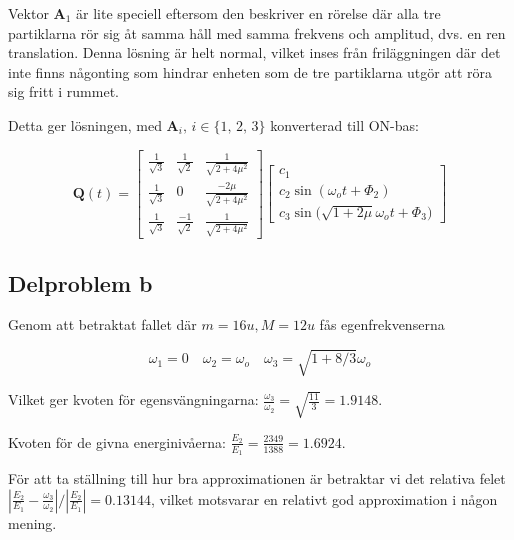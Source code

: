 \documentclass[12pt,a4paper]{article}
\begin{document}
	Vektor $\mathbf{A}_1$ är lite speciell eftersom den beskriver en rörelse där alla tre partiklarna rör
	sig åt samma håll med samma frekvens och amplitud, dvs. en ren translation. Denna lösning är
	helt normal, vilket inses från friläggningen där det inte finns någonting som hindrar enheten
	som de tre partiklarna utgör att röra sig fritt i rummet.
	
	Detta ger lösningen, med $\mathbf{A}_i, \, i \in \{1,\,2,\,3\}$ konverterad till ON-bas:
	
	\begin{equation*}
		\mathbf{Q}(t) = 
		\begin{bmatrix}
			\frac{1}{\sqrt{3}} & \frac{1}{\sqrt{2}}  & \frac{1}{\sqrt{2 + 4 \mu^2}} \\
			\frac{1}{\sqrt{3}} & 0                   & \frac{-2 \mu}{\sqrt{2 + 4 \mu^2}} \\
			\frac{1}{\sqrt{3}} & \frac{-1}{\sqrt{2}} & \frac{1}{\sqrt{2 + 4 \mu^2}}
		\end{bmatrix}
		\begin{bmatrix}
			c_1 \\
			c_2 \sin(\omega_o t + \Phi_2) \\
			c_3 \sin\big(\sqrt{1+2 \mu}\omega_o t + \Phi_3 \big)
		\end{bmatrix}
	\end{equation*}

	\subsection{Delproblem b}
		
		Genom att betraktat fallet där $m=16u, M=12u$ fås egenfrekvenserna 
		
		\begin{equation*}
			\omega_1 = 0 \hspace{12pt} \omega_2 = \omega_o \hspace{12pt} \omega_3 = \sqrt{1+8/3} \omega_o
		\end{equation*}
		
		Vilket ger kvoten för egensvängningarna: $\frac{\omega_3}{\omega_2} =\sqrt{\frac{11}{3}} = 1.9148$.
		
		Kvoten för de givna energinivåerna: $\frac{E_2}{E_1} = \frac{2349}{1388} = 1.6924$.
		
		För att ta ställning till hur bra approximationen är betraktar vi det relativa felet
		$|\frac{E_2}{E_1}-\frac{\omega_3}{\omega_2}|/|\frac{E_2}{E_1}| = 0.13144$,
		vilket motsvarar en relativt god approximation i någon mening.
\end{document}
